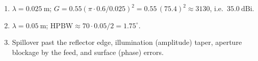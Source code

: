 \begin{enumerate}[leftmargin=1.6em,itemsep=2pt]
\item $\lambda = 0.025\ \text{m}$; $G = 0.55(\pi\cdot0.6/0.025)^2 = 0.55\,(75.4)^2 \approx 3130$, i.e.\ $35.0\ \text{dBi}$.
\item $\lambda = 0.05\ \text{m}$; $\text{HPBW}\approx 70\cdot0.05/2 = 1.75^\circ$.
\item Spillover past the reflector edge, illumination (amplitude) taper, aperture blockage by the feed, and surface (phase) errors.
\end{enumerate}

